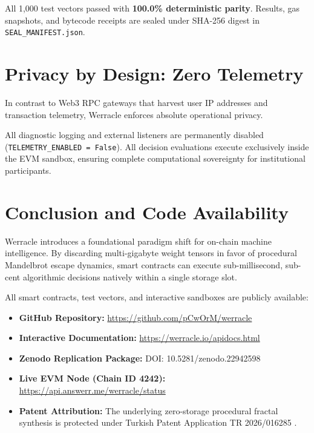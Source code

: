 \documentclass[10pt,twocolumn]{article}
\begin{document}
All 1,000 test vectors passed with \textbf{100.0\% deterministic parity}. Results, gas snapshots, and bytecode receipts are sealed under SHA-256 digest in \texttt{SEAL\_MANIFEST.json}.

\section{Privacy by Design: Zero Telemetry}
In contrast to Web3 RPC gateways that harvest user IP addresses and transaction telemetry, Werracle enforces absolute operational privacy.

All diagnostic logging and external listeners are permanently disabled (\texttt{TELEMETRY\_ENABLED = False}). All decision evaluations execute exclusively inside the EVM sandbox, ensuring complete computational sovereignty for institutional participants.

\section{Conclusion and Code Availability}
Werracle introduces a foundational paradigm shift for on-chain machine intelligence. By discarding multi-gigabyte weight tensors in favor of procedural Mandelbrot escape dynamics, smart contracts can execute sub-millisecond, sub-cent algorithmic decisions natively within a single storage slot.

All smart contracts, test vectors, and interactive sandboxes are publicly available:
\begin{itemize}
    \item \textbf{GitHub Repository:} \url{https://github.com/pCwOrM/werracle}
    \item \textbf{Interactive Documentation:} \url{https://werracle.io/apidocs.html}
    \item \textbf{Zenodo Replication Package:} DOI: 10.5281/zenodo.22942598 \cite{dargli2026werracle_zenodo}
    \item \textbf{Live EVM Node (Chain ID 4242):} \url{https://api.answerr.me/werracle/status}
    \item \textbf{Patent Attribution:} The underlying zero-storage procedural fractal synthesis is protected under Turkish Patent Application TR 2026/016285 \cite{turkpatent2026werr}.
\end{itemize}
\end{document}
